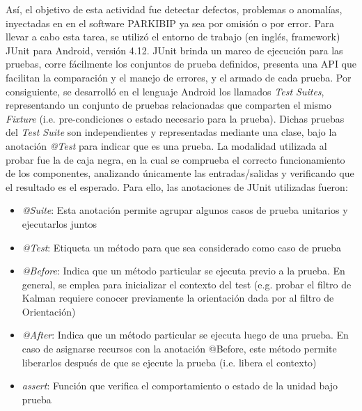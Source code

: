 Así, el objetivo de esta actividad fue detectar defectos, problemas o anomalías, inyectadas en en el software PARKIBIP ya sea por omisión o por error. Para llevar a cabo esta tarea, se utilizó el entorno de trabajo (en inglés, framework) JUnit para Android, versión 4.12. JUnit brinda un marco de ejecución para las pruebas, corre fácilmente los conjuntos de prueba definidos, presenta una API que facilitan la comparación y el manejo de errores, y el armado de cada prueba. 
Por consiguiente, se desarrolló en el lenguaje Android los llamados \textit{Test Suites}, representando un conjunto de pruebas relacionadas que comparten el mismo \textit{Fixture} (i.e. pre-condiciones o estado necesario para la prueba). Dichas pruebas del \textit{Test Suite} son independientes y representadas mediante una clase, bajo la anotación \textit{@Test} para indicar que es una prueba. La modalidad utilizada al probar fue la de caja negra, en la cual se comprueba el correcto funcionamiento de los componentes, analizando únicamente las entradas/salidas y verificando que el resultado es el esperado. Para ello, las anotaciones de JUnit utilizadas fueron:
\begin{itemize}
    \item \textit{@Suite}: Esta anotación permite agrupar algunos casos de prueba unitarios y ejecutarlos juntos
    \item \textit{@Test}: Etiqueta un método para que sea considerado como caso de prueba
    \item \textit{@Before}: Indica que un método particular se ejecuta previo a la prueba. En general, se emplea para inicializar el contexto del test (e.g. probar el filtro de Kalman requiere conocer previamente la orientación dada por al filtro de Orientación) 
    \item \textit{@After}: Indica que un método particular se ejecuta luego de una prueba. En caso de asignarse recursos con la anotación @Before, este método permite liberarlos después de que se ejecute la prueba (i.e. libera el contexto)
    \item \textit{assert}: Función que verifica el comportamiento o estado de la unidad bajo prueba
\end{itemize}

